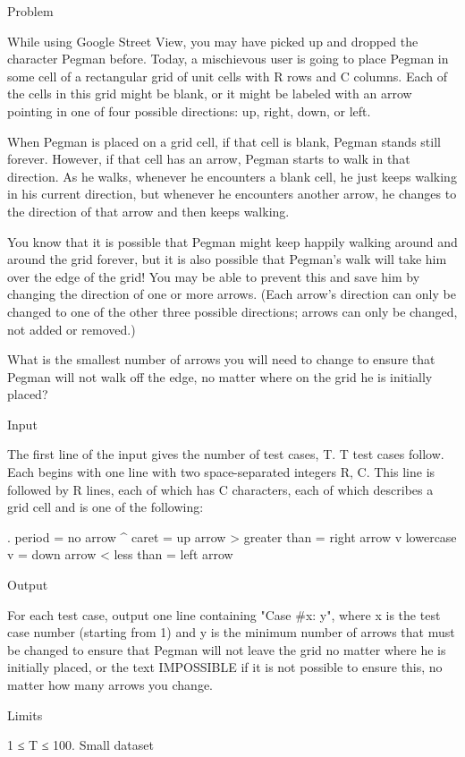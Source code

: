 Problem

While using Google Street View, you may have picked up and dropped the character Pegman before. Today, a mischievous user is going to place Pegman in some cell of a rectangular grid of unit cells with R rows and C columns. Each of the cells in this grid might be blank, or it might be labeled with an arrow pointing in one of four possible directions: up, right, down, or left.

When Pegman is placed on a grid cell, if that cell is blank, Pegman stands still forever. However, if that cell has an arrow, Pegman starts to walk in that direction. As he walks, whenever he encounters a blank cell, he just keeps walking in his current direction, but whenever he encounters another arrow, he changes to the direction of that arrow and then keeps walking.

You know that it is possible that Pegman might keep happily walking around and around the grid forever, but it is also possible that Pegman's walk will take him over the edge of the grid! You may be able to prevent this and save him by changing the direction of one or more arrows. (Each arrow's direction can only be changed to one of the other three possible directions; arrows can only be changed, not added or removed.)

What is the smallest number of arrows you will need to change to ensure that Pegman will not walk off the edge, no matter where on the grid he is initially placed?

Input

The first line of the input gives the number of test cases, T. T test cases follow. Each begins with one line with two space-separated integers R, C. This line is followed by R lines, each of which has C characters, each of which describes a grid cell and is one of the following:

. period = no arrow
^ caret = up arrow
> greater than = right arrow
v lowercase v = down arrow
< less than = left arrow

Output

For each test case, output one line containing "Case #x: y", where x is the test case number (starting from 1) and y is the minimum number of arrows that must be changed to ensure that Pegman will not leave the grid no matter where he is initially placed, or the text IMPOSSIBLE if it is not possible to ensure this, no matter how many arrows you change.

Limits

1 ≤ T ≤ 100.
Small dataset

